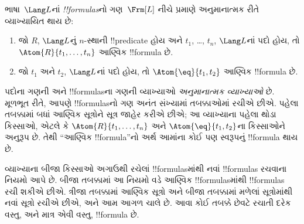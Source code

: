 \documentclass[../../../include/open-logic-section]{subfiles}
\begin{document}
\begin{defn}[સૂત્રો]
ભાષા~$\Lang L$નાં \emph{!!{formula}s}નો ગણ~$\Frm[L]$ નીચે પ્રમાણે
અનુમાનાત્મક રીતે વ્યાખ્યાયિત થાય છે:
\begin{enumerate}


\item જો $R$, $\Lang L$નું $n$-સ્થાની !!{predicate} હોય અને $t_1$,
  \dots, $t_n$, $\Lang L$નાં પદો હોય, તો
  $\Atom{R}{t_1,\ldots,t_n}$ આણ્વિક !!{formula} છે.

\item જો $t_1$ અને $t_2$, $\Lang L$નાં પદો હોય, તો
  $\Atom{\eq}{t_1,t_2}$ આણ્વિક !!{formula} છે.








\end{enumerate}
\end{defn}

\begin{explain}
પદોના ગણની અને !!{formula}sના ગણની વ્યાખ્યાઓ \emph{અનુમાનાત્મક
વ્યાખ્યાઓ} છે. મૂળભૂત રીતે, આપણે !!{formula}sનો ગણ અનંત સંખ્યામાં
તબક્કાઓમાં રચીએ છીએ. પહેલા તબક્કામાં બધાં આણ્વિક સૂત્રોને સૂત્ર જાહેર
કરીએ છીએ; આ વ્યાખ્યાના પહેલા થોડા કિસ્સાઓ, એટલે કે
%
%
$\Atom{R}{t_1,\dots,t_n}$ અને $\Atom{\eq}{t_1,t_2}$ના કિસ્સાઓને
અનુરૂપ છે. તેથી ``આણ્વિક !!{formula}''નો અર્થ આમાંના કોઈ પણ સ્વરૂપનું
!!{formula} થાય છે.

વ્યાખ્યાના બીજા કિસ્સાઓ અગાઉથી રચેલાં !!{formula}sમાંથી નવાં
!!{formula}s રચવાના નિયમો આપે છે. બીજા તબક્કામાં આ નિયમો વડે આણ્વિક
!!{formula}sમાંથી !!{formula}s રચી શકીએ છીએ. ત્રીજા તબક્કામાં આણ્વિક
સૂત્રો અને બીજા તબક્કામાં મળેલાં સૂત્રોમાંથી નવાં સૂત્રો રચીએ છીએ,
અને આમ આગળ ચાલે છે. આવા કોઈ તબક્કે છેવટે રચાતી દરેક વસ્તુ, અને માત્ર
એવી વસ્તુ, !!{formula} છે.
\end{explain}
\end{document}

